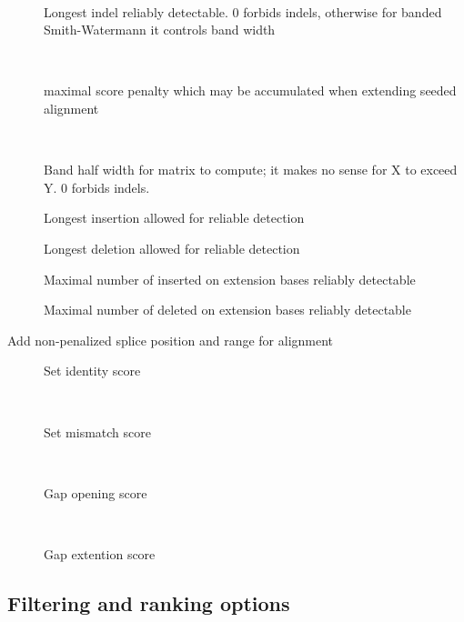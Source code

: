 \documentclass[english]{article}
\begin{document}
\begin{description}
\item[~~]
				Longest indel reliably detectable. 0 forbids indels, otherwise 
                for banded Smith-Watermann it controls band width
\item[~~]
				maximal score penalty which may be accumulated when extending
                seeded alignment
\item[~~]
				Band half width for matrix to compute; it makes no sense for X
                to exceed Y. 0 forbids indels.
\item[]
				Longest insertion allowed for reliable detection
\item[]
				Longest deletion allowed for reliable detection
\item[]
				Maximal number of inserted on extension bases reliably detectable
\item[]
				Maximal number of deleted on extension bases reliably detectable
\item[
				Add non-penalized splice position and range for alignment
\item[\OptArg{--identity-score}{=score}~~\OptArg{-I}{~score}]
				Set identity score
\item[~~]
				Set mismatch score
\item[~~]
				Gap opening score
\item[~~]
				Gap extention score
\end{description}

\subsection{Filtering and ranking options}
\end{document}
